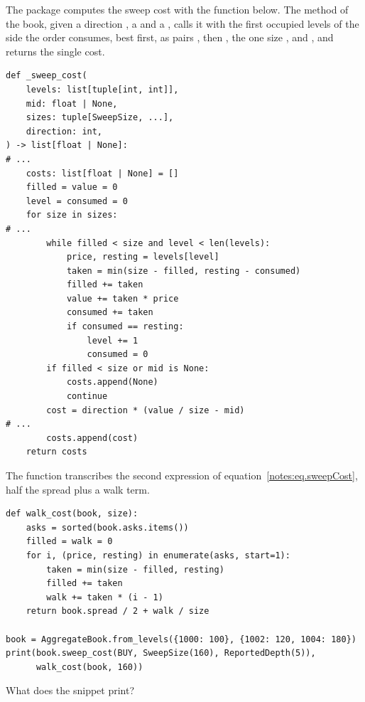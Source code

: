 \begin{question}
\label{question.sweepCostWalksTheGrid}
The package computes the sweep cost with the function below.
The method  of the book,
given a direction , a  and a ,
calls it with the first  occupied levels of the side the order consumes,
best first, as pairs ,
then , the one size , and ,
and returns the single cost.
\begin{lstlisting}[caption={\protect\codehl{unito26.lob.orderbook.\_sweep\_cost}, abridged.}, label=listing.sweepCostFunction]
def _sweep_cost(
    levels: list[tuple[int, int]],
    mid: float | None,
    sizes: tuple[SweepSize, ...],
    direction: int,
) -> list[float | None]:
# ...
    costs: list[float | None] = []
    filled = value = 0
    level = consumed = 0
    for size in sizes:
# ...
        while filled < size and level < len(levels):
            price, resting = levels[level]
            taken = min(size - filled, resting - consumed)
            filled += taken
            value += taken * price
            consumed += taken
            if consumed == resting:
                level += 1
                consumed = 0
        if filled < size or mid is None:
            costs.append(None)
            continue
        cost = direction * (value / size - mid)
# ...
        costs.append(cost)
    return costs
\end{lstlisting}
The function  transcribes the second expression
of equation~\eqref{notes:eq.sweepCost},
half the spread plus a walk term.
\begin{lstlisting}[caption={The second expression of the sweep cost, on a book with a gap}, label=listing.sweepCostWalkTerm]
def walk_cost(book, size):
    asks = sorted(book.asks.items())
    filled = walk = 0
    for i, (price, resting) in enumerate(asks, start=1):
        taken = min(size - filled, resting)
        filled += taken
        walk += taken * (i - 1)
    return book.spread / 2 + walk / size

book = AggregateBook.from_levels({1000: 100}, {1002: 120, 1004: 180})
print(book.sweep_cost(BUY, SweepSize(160), ReportedDepth(5)),
      walk_cost(book, 160))
\end{lstlisting}
What does the snippet print?
\begin{choices}
 \choice {}
 \choice {}
 \choice {}
 \correctchoice {}
\end{choices}
\end{question}

